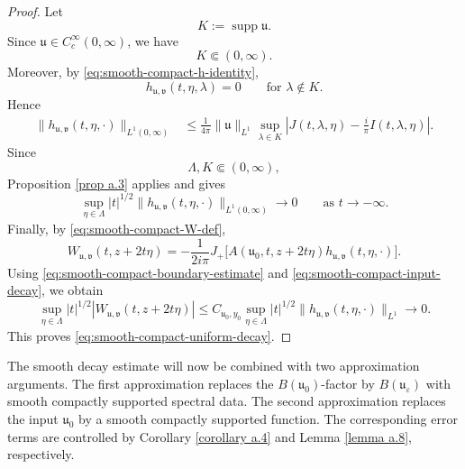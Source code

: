 \documentclass[10pt]{article}
\numberwithin{equation}{section}
\numberwithin{theorem}{section}
\begin{document}
\begin{proof}
Let
\[
K:=\operatorname{supp}\mathfrak u .
\]
Since \(\mathfrak u\in C_c^\infty(0,\infty)\), we have
\[
K\Subset(0,\infty).
\]
Moreover, by \eqref{eq:smooth-compact-h-identity},
\[
h_{\mathfrak u,\mathfrak v}(t,\eta,\lambda)=0
\qquad\text{for }\lambda\notin K.
\]
Hence
\begin{equation}
\label{eq:smooth-compact-input-L1-bound}
\begin{aligned}
\|h_{\mathfrak u,\mathfrak v}(t,\eta,\cdot)\|_{L^1(0,\infty)}
&\le
\frac1{4\pi}
\|\mathfrak u\|_{L^1}
\sup_{\lambda\in K}
\left|
J(t,\lambda,\eta)-\frac{i}{\pi}I(t,\lambda,\eta)
\right|.
\end{aligned}
\end{equation}
Since
\[
\Lambda,K\Subset(0,\infty),
\]
Proposition \ref{prop a.3} applies and gives
\begin{equation}
\label{eq:smooth-compact-input-decay}
\sup_{\eta\in\Lambda}
|t|^{1/2}
\|h_{\mathfrak u,\mathfrak v}(t,\eta,\cdot)\|_{L^1(0,\infty)}
\longrightarrow0
\qquad\text{as }t\to-\infty.
\end{equation}
Finally, by \eqref{eq:smooth-compact-W-def},
\[
W_{\mathfrak u,\mathfrak v}(t,z+2t\eta)
=
-\frac1{2i\pi}
J_+\bigl[
A(\mathfrak u_0,t,z+2t\eta)
h_{\mathfrak u,\mathfrak v}(t,\eta,\cdot)
\bigr].
\]
Using \eqref{eq:smooth-compact-boundary-estimate} and
\eqref{eq:smooth-compact-input-decay}, we obtain
\[
\sup_{\eta\in\Lambda}
|t|^{1/2}
\left|
W_{\mathfrak u,\mathfrak v}(t,z+2t\eta)
\right|
\le
C_{\mathfrak u_0,y_0}
\sup_{\eta\in\Lambda}
|t|^{1/2}
\|h_{\mathfrak u,\mathfrak v}(t,\eta,\cdot)\|_{L^1}
\longrightarrow0.
\]
This proves \eqref{eq:smooth-compact-uniform-decay}.
\end{proof}

The smooth decay estimate will now be combined with two approximation arguments. The
first approximation replaces the \(B(\mathfrak u_0)\)-factor by \(B(\mathfrak u_\varepsilon)\)
with smooth compactly supported spectral data. The second approximation replaces the
input \(\mathfrak u_0\) by a smooth compactly supported function. The corresponding error
terms are controlled by Corollary \ref{corollary a.4} and Lemma \ref{lemma a.8},
respectively.
\end{document}
